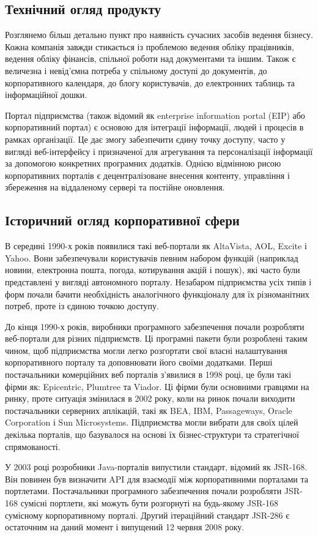 \subsection{Технічний огляд продукту}
Розглянемо більш детально пункт про наявність сучасних засобів ведення бізнесу. 
Кожна компанія завжди стикається із проблемою ведення обліку працівників, ведення обліку фінансів, спільної роботи над документами та іншим.
Також є величезна і невід'ємна потреба у спільному доступі до документів, до корпоративного календаря, до блогу користувачів, до електронних таблиць та інформаційної дошки.
\par Портал підприємства (також відомий як enterprise information portal (EIP) або корпоративний портал) є основою для інтеграції інформації, людей і процесів в рамках організації. 
Це дає змогу забезпечити єдину точку доступу, часто у вигляді веб-інтерфейсу і призначеної для агрегування та персоналізації інформації за допомогою конкретних програмних додатків. Однією відмінною рисою корпоративних порталів є децентралізоване внесення контенту, управління і збереження на віддаленому сервері та постійне оновлення.


\subsection{Історичний огляд корпоративної сфери}
В середині 1990-х років появилися такі веб-портали як AltaVista, AOL, Excite і Yahoo. 
Вони забезпечували користувачів певним набором функцій (наприклад новини, електронна пошта, погода, котирування акцій і пошук), які часто були представлені у вигляді автономного порталу.
Незабаром підприємства усіх типів і форм почали бачити необхідність аналогічного функціоналу для їх різноманітних потреб, проте із єдиною точкою доступу.
\par До кінця 1990-х років, виробники програмного забезпечення почали розробляти веб-портали для різних підприємств. 
Ці програмні пакети були розроблені таким чином, щоб підприємства могли легко розгортати свої власні налаштування корпоративного порталу та доповнювати його своїми додатками.
Перші постачальники комерційних веб порталів з'явилися в 1998 році, це були такі фірми як: Epicentric, Plumtree  та Viador. 
Ці фірми були основними гравцями на ринку, проте ситуація змінилася в 2002 року, коли на ринок почали виходити постачальники серверних аплікацій, такі як BEA, IBM, Passageways, Oracle Corporation і Sun Microsystems.
Підприємства могли вибрати для своїх цілей декілька порталів, що базувалося на основі їх бізнес-структури та стратегічної спрямованості.
\par У 2003 році розробники Java-порталів випустили стандарт, відомий як JSR-168. 
Він повинен був визначити API для взаємодії між корпоративними порталами та портлетами.
Постачальники програмного забезпечення почали розробляти JSR-168 сумісні портлети, які можуть бути розгорнуті на будь-якому JSR-168 сумісному корпоративному порталі. 
Другий ітераційний стандарт JSR-286 є остаточним на даний момент і випущений 12 червня 2008 року.

